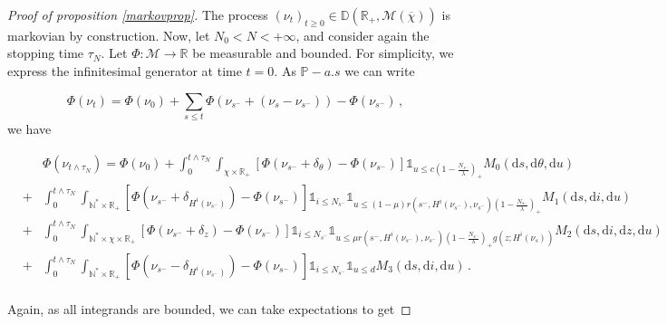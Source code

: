 \documentclass[a4paper,11pt]{article}
\newcommand{\dx}{\textrm{d}}
\begin{document}
\begin{proof}[Proof of proposition \ref{markovprop}]
The process $(\nu_t)_{t\geq 0} \in \mathbb{D}(\mathbb{R}_+,\mathcal{M}(\overline{\chi}))$ is markovian by construction. Now, let $N_0 <N< +\infty$, and consider again the stopping time $\tau_N$. Let $\Phi :  \mathcal{M} \rightarrow \mathbb{R}$ be measurable and bounded. For simplicity, we express the infinitesimal generator at time $t=0$. As $\mathbb{P}-a.s$ we can write

\begin{equation}\label{Phi(nu)}
\Phi(\nu_t) = \Phi(\nu_0)  + \sum_{s\leq t} \Phi(\nu_{s^-} + (\nu_{s}-\nu_{s^-}))-\Phi(\nu_{s^-})\,, 
\end{equation}
we have

\begin{eqnarray*}
&& \Phi(\nu_{t\wedge \tau_N}) = \Phi(\nu_{0}) + \int_0^{t\wedge \tau_N} \int_{\chi\times \mathbb{R}_+} \left[ \Phi(\nu_{s^-} + \delta_{\theta}) -\Phi(\nu_{s^-} )  \right] \mathds{1}_{u\leq c(1-\frac{N_{s^-}}{\lambda})_+} M_0(\dx s,\dx \theta,\dx u) \\
&+& \int_0^{t\wedge \tau_N} \int_{\mathbb{N^*}\times \mathbb{R}_+} \left[ \Phi(\nu_{s^-} + \delta_{H^i(\nu_{s^-})}) -\Phi(\nu_{s^-})   \right] \mathds{1}_{i\leq N_{s^-}} \mathds{1}_{u\leq (1-\mu) r(s^-,H^i(\nu_{s^-}),\nu_{s^-})(1-\frac{N_{s^-}}{\lambda})_+} M_1(\dx s,\dx i,\dx u)  \\
&+& \int_0^{t\wedge \tau_N} \int_{\mathbb{N^*}\times  \chi \times \mathbb{R}_+} \left[ \Phi(\nu_{s^-} + \delta_{z}) -\Phi(\nu_{s^-})   \right] \mathds{1}_{i\leq N_{s^-}} \mathds{1}_{u\leq \mu r(s^-,H^i(\nu_{s^-}),\nu_{s^-})(1-\frac{N_{s^-}}{\lambda})_+ g( z; H^i(\nu_{s}))} M_2(\dx s,\dx i,\dx z, \dx u)  \\
&+& \int_0^{t\wedge \tau_N} \int_{\mathbb{N^*} \times \mathbb{R}_+} \left[ \Phi(\nu_{s^-} - \delta_{H^i(\nu_{s^-})}) -\Phi(\nu_{s^-})   \right] \mathds{1}_{i\leq N_{s^-}} \mathds{1}_{u\leq d} M_3(\dx s,\dx i, \dx u)\,.  \\
\end{eqnarray*}

Again, as all integrands are bounded, we can take expectations to get


\end{proof}
\end{document}
